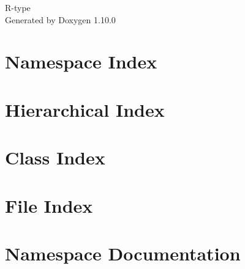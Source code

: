 \documentclass[twoside]{book}
\newcommand{\+}{\discretionary{\mbox{\scriptsize$\hookleftarrow$}}{}{}}
\newcommand{\clearemptydoublepage}{%
    \newpage{\pagestyle{empty}\cleardoublepage}%
  }
\begin{document}
  \raggedbottom
    \hypersetup{pageanchor=false,
                bookmarksnumbered=true,
                pdfencoding=unicode
               }
  \begin{titlepage}
  \vspace*{7cm}
  \begin{center}%
  {\Large R-\/type}\\
  \vspace*{1cm}
  {\large Generated by Doxygen 1.10.0}\\
  \end{center}
  \end{titlepage}
  \clearemptydoublepage
  \tableofcontents
  \clearemptydoublepage
  \hypersetup{pageanchor=true}





\chapter{Namespace Index}

\chapter{Hierarchical Index}

\chapter{Class Index}

\chapter{File Index}

\chapter{Namespace Documentation}






\end{document}
